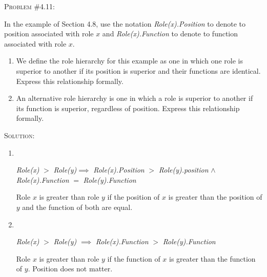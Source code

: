 \documentclass[12pt]{article}
\newenvironment{problem}[1]
{\begin{mdframed}[linewidth=0.8pt]
        \textsc{Problem #1:}

}
    {\end{mdframed}}
\newenvironment{solution}
    {\textsc{Solution:}\\}
    {\newpage}%
\begin{document}
	\begin{problem}{\#4.11}
		In the example of Section 4.8, use the notation \textit{Role(x).Position} to denote
		to position associated with role $x$ and \textit{Role(x).Function} to denote
		to function associated with role $x$.
		\begin{enumerate}[label=\alph*]
			\item We define the role hierarchy for this example as one in which
				one role is superior to another if its position is superior
				and their functions are identical. Express this relationship
				formally.
			\item An alternative role hierarchy is one in which a role is superior
				to another if its function is superior, regardless of position.
				Express this relationship formally.
		\end{enumerate}
	\end{problem}
	\begin{solution}
		\begin{enumerate}[label=\alph*]
			\item \ \ 
				\begin{center}
					\textit{Role(x)} $>$ \textit{Role(y)}$\implies$ \textit{Role(x).Position} $>$
					\textit{Role(y).position}  $\wedge$ \\
					\textit{Role(x).Function}  $=$ \textit{Role(y).Function}
				\end{center}
				Role $x$ is greater than role $y$ if the position of $x$ is greater than
				the position of $y$ and the function of both are equal.
			\item \ \
				\begin{center}
					\textit{Role(x)} $>$ \textit{Role(y)}  $\implies$ \textit{Role(x).Function} 
					$>$ \textit{Role(y).Function}
				\end{center}
				Role $x$ is greater than role $y$ if the function of $x$ is greater
				than the function of $y$. Position does not matter.
		
		\end{enumerate}
	\end{solution}
\end{document}
